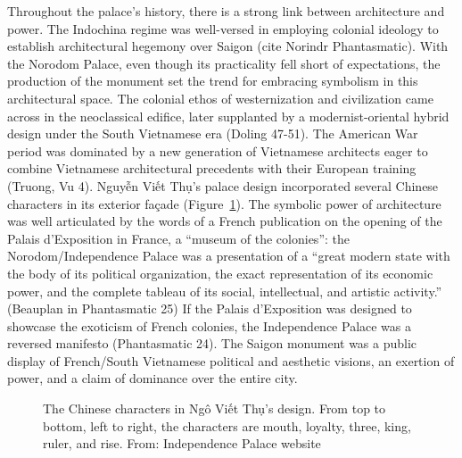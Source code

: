 Throughout the palace's history, there is a strong link between architecture and power. The Indochina regime was well-versed in employing colonial ideology to establish architectural hegemony over Saigon (cite Norindr Phantasmatic). With the Norodom Palace, even though its practicality fell short of expectations, the production of the monument set the trend for embracing symbolism in this architectural space. The colonial ethos of westernization and civilization came across in the neoclassical edifice, later supplanted by a modernist-oriental hybrid design under the South Vietnamese era (Doling 47-51). The American War period was dominated by a new generation of Vietnamese architects eager to combine Vietnamese architectural precedents with their European training (Truong, Vu 4). Nguyễn Viết Thụ’s palace design incorporated several Chinese characters in its exterior façade (Figure~\ref{palace_chinese}). The symbolic power of architecture was well articulated by the words of a French publication on the opening of the Palais d’Exposition in France, a “museum of the colonies”: the Norodom/Independence Palace was a presentation of a “great modern state with the body of its political organization, the exact representation of its economic power, and the complete tableau of its social, intellectual, and artistic activity.” (Beauplan in Phantasmatic 25) If the Palais d’Exposition was designed to showcase the exoticism of French colonies, the Independence Palace was a reversed manifesto (Phantasmatic 24). The Saigon monument was a public display of French/South Vietnamese political and aesthetic visions, an exertion of power, and a claim of dominance over the entire city. \en

\begin{figure}[!ht]
\begin{center}
\vspace{-.2 in}
\caption{\vi The Chinese characters in Ngô Viết Thụ's design. From top to bottom, left to right, the characters are mouth, loyalty, three, king, ruler, and rise. From: Independence Palace website \en}\label{palace_chinese}
\end{center}
\vspace{-.2 in}
\end{figure}

